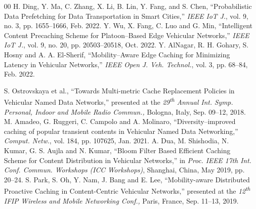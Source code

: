 \documentclass[journal]{IEEEtran}
\begin{document}
\begin{thebibliography}{00}
 H. Ding, Y. Ma, C. Zhang, X. Li, B. Lin, Y. Fang, and S. Chen, ``Probabilistic Data Prefetching for Data Transportation in Smart Cities,'' \emph{IEEE IoT J.}, vol. 9, no. 3, pp. 1655--1666, Feb. 2022.
 Y. Wu, X. Fang, C. Luo and G. Min, ``Intelligent Content Precaching Scheme for Platoon--Based Edge Vehicular Networks,'' \emph{IEEE IoT J.}, vol. 9, no. 20, pp. 20503--20518, Oct. 2022.
 Y. AlNagar, R. H. Gohary, S. Hosny and A. A. El-Sherif, ``Mobility--Aware Edge Caching for Minimizing Latency in Vehicular Networks,'' \emph{IEEE Open J. Veh. Technol.}, vol. 3, pp. 68--84, Feb. 2022.



 S. Ostrovskaya et al.,  ``Towards Multi-metric Cache Replacement Policies in Vehicular Named Data Networks,'' presented at the \emph{29\textsuperscript{th} Annual Int. Symp. Personal, Indoor and Mobile Radio Commun.,} Bologna, Italy, Sep. 09--12, 2018.
 M. Amadeo, G. Ruggeri, C. Campolo and A. Molinaro, ``Diversity--improved caching of popular transient contents in Vehicular Named Data Networking,'' \emph{Comput. Netw.}, vol. 184, pp. 107625, Jan. 2021.
 A. Dua, M. Shishodia, N. Kumar, G. S. Aujla and N. Kumar, ``Bloom Filter Based Efficient Caching Scheme for Content Distribution in Vehicular Networks,'' in \emph{Proc. IEEE 17th Int. Conf. Commun. Workshops (ICC Workshops)}, Shanghai, China, May 2019, pp. 20--24.
 S. Park, S. Oh, Y. Nam, J. Bang and E. Lee,  ``Mobility-aware Distributed Proactive Caching in Content-Centric Vehicular Networks,'' presented at the \emph{12\textsuperscript{th} IFIP Wireless and Mobile Networking Conf.,} Paris, France, Sep. 11--13, 2019.


\end{thebibliography}
\end{document}
